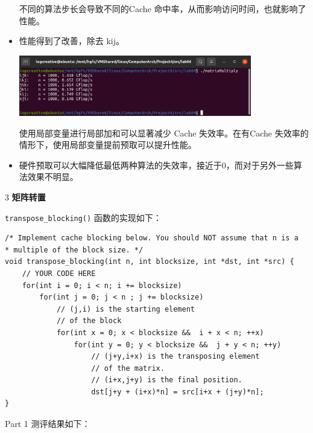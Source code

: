 \documentclass[12pt,a4paper]{article}
\newenvironment{problems}{\begin{list}{}{\renewcommand{\makelabel}[1]{\textbf{##1}.\hfil}}}{\end{list}}
\newenvironment{steps}{\begin{list}{}{\renewcommand{\makelabel}[1]{(##1)\hfil}}}{\end{list}}
\begin{document}
\begin{problems}
\begin{itemize}
        不同的算法步长会导致不同的Cache 命中率，从而影响访问时间，也就影响了性能。

        \item 性能得到了改善，除去 kij。
        
        \includegraphics[width=0.8\textwidth]{matrix2.png}

        使用局部变量进行局部加和可以显著减少 Cache 失效率。在有Cache 失效率的情形下，使用局部变量提前预取可以提升性能。

        \item 硬件预取可以大幅降低最低两种算法的失效率，接近于0，而对于另外一些算法效果不明显。
    \end{itemize}

    \item[3] \textbf{矩阵转置}
    
    \verb"transpose_blocking()" 函数的实现如下：
    \begin{lstlisting}
/* Implement cache blocking below. You should NOT assume that n is a
* multiple of the block size. */
void transpose_blocking(int n, int blocksize, int *dst, int *src) {
    // YOUR CODE HERE
    for(int i = 0; i < n; i += blocksize)
        for(int j = 0; j < n ; j += blocksize)
            // (j,i) is the starting element
            // of the block
            for(int x = 0; x < blocksize &&  i + x < n; ++x)
                for(int y = 0; y < blocksize &&  j + y < n; ++y)
                    // (j+y,i+x) is the transposing element
                    // of the matrix.
                    // (i+x,j+y) is the final position.
                    dst[j+y + (i+x)*n] = src[i+x + (j+y)*n];
}
    \end{lstlisting}

    \begin{steps}
        \item[Part 1] 测评结果如下：
        

\end{steps}
\end{problems}
\end{document}
